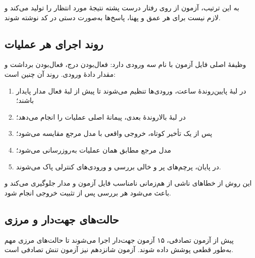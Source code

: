\documentclass[11pt,a4paper]{article}
\newcommand{\code}[1]{\lr{\texttt{\detokenize{#1}}}}
\begin{document}
به این ترتیب، آزمون از روی رفتار درست پشته نتیجۀ مورد انتظار را تولید می‌کند و لازم نیست برای هر عمق و پهنا، پاسخ‌ها به‌صورت دستی در کد نوشته شوند.

\subsection{روند اجرای هر عملیات}

وظیفۀ اصلی فایل آزمون با نام \code{apply_operation} سه ورودی دارد: فعال‌بودن درج، فعال‌بودن برداشت و مقدار دادۀ ورودی. روند آن چنین است:

\begin{enumerate}[itemsep=0.3em]
  \item در لبۀ پایین‌روندۀ ساعت، ورودی‌ها تنظیم می‌شوند تا پیش از لبۀ فعال مدار پایدار باشند؛
  \item در لبۀ بالاروندۀ بعدی، پیمانۀ اصلی عملیات را انجام می‌دهد؛
  \item پس از یک تأخیر کوتاه، خروجی واقعی با مدل مرجع مقایسه می‌شود؛
  \item مدل مرجع مطابق همان عملیات به‌روزرسانی می‌شود؛
  \item در پایان، پرچم‌های پر و خالی بررسی و ورودی‌های کنترلی پاک می‌شوند.
\end{enumerate}

این روش از خطاهای ناشی از هم‌زمانی نامناسب فایل آزمون و مدار جلوگیری می‌کند و باعث می‌شود هر بررسی پس از تثبیت خروجی انجام شود.

\subsection{حالت‌های جهت‌دار و مرزی}

پیش از آزمون تصادفی، ۱۵ آزمون جهت‌دار اجرا می‌شوند تا حالت‌های مرزی مهم به‌طور قطعی پوشش داده شوند. آزمون شانزدهم نیز آزمون تنش تصادفی است.
\end{document}

